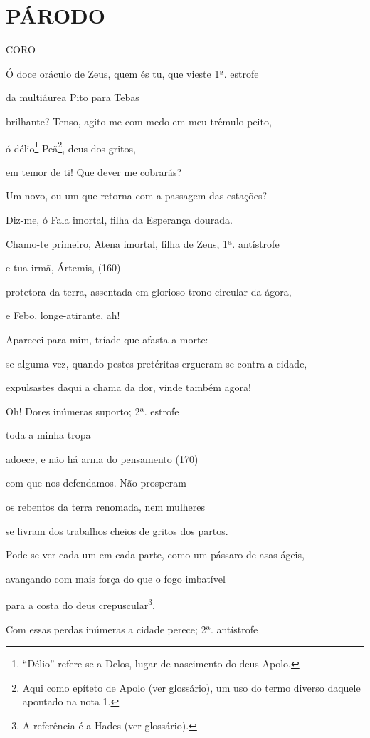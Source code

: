 \section{PÁRODO}

\textsc{CORO}

Ó doce oráculo de Zeus, quem és tu, que vieste 1ª. estrofe

da multiáurea Pito para Tebas

brilhante? Tenso, agito-me com medo em meu trêmulo peito,

ó délio\footnote{``Délio'' refere-se a Delos, lugar de nascimento do
  deus Apolo.} Peã\footnote{Aqui como epíteto de Apolo (ver glossário),
  um uso do termo diverso daquele apontado na nota 1.}, deus dos gritos,

em temor de ti! Que dever me cobrarás?

Um novo, ou um que retorna com a passagem das estações?

Diz-me, ó Fala imortal, filha da Esperança dourada.

Chamo-te primeiro, Atena imortal, filha de Zeus, 1ª. antístrofe

e tua irmã, Ártemis, (160)

protetora da terra, assentada em glorioso trono circular da ágora,

e Febo, longe-atirante, ah!

Aparecei para mim, tríade que afasta a morte:

se alguma vez, quando pestes pretéritas ergueram-se contra a cidade,

expulsastes daqui a chama da dor, vinde também agora!

Oh! Dores inúmeras suporto; 2ª. estrofe

toda a minha tropa

adoece, e não há arma do pensamento (170)

com que nos defendamos. Não prosperam

os rebentos da terra renomada, nem mulheres

se livram dos trabalhos cheios de gritos dos partos.

Pode-se ver cada um em cada parte, como um pássaro de asas ágeis,

avançando com mais força do que o fogo imbatível

para a costa do deus crepuscular\footnote{A referência é a Hades (ver
  glossário).}.

Com essas perdas inúmeras a cidade perece; 2ª. antístrofe

